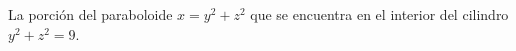 \item La porción del paraboloide $x = y^2 + z^2$ que se encuentra en el interior del cilindro $y^2 + z^2 = 9$.
